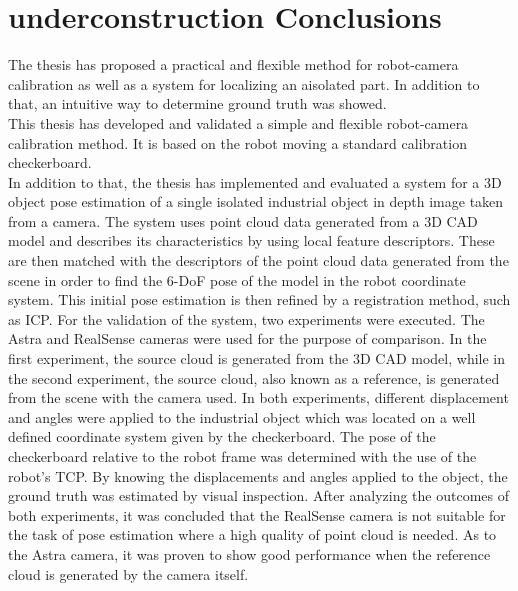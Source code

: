\chapter{underconstruction Conclusions}
\label{chap:con}


The thesis has proposed a practical and flexible method for robot-camera calibration as well as a system for localizing an aisolated part. In addition to that, an intuitive way to determine ground truth was showed.\\

This thesis has developed and validated a simple and flexible robot-camera calibration method. It is based on the robot moving a standard calibration checkerboard. \\



In addition to that, the thesis has implemented and evaluated a system for a 3D object pose estimation of a single isolated industrial object in depth image taken from a camera. The system uses point cloud data generated from a 3D CAD model and describes its characteristics by using local feature descriptors. These are then matched with the descriptors of the point cloud data generated from the scene in order to find the 6-DoF pose of the model in the robot coordinate system. This initial pose estimation is then refined by a registration method, such as ICP.  For the validation of the system, two experiments were executed. The Astra and RealSense cameras were used for the purpose of comparison. In the first experiment,  the source cloud is generated from the 3D CAD model, while in the second experiment, the source cloud, also known as a reference, is generated from the scene with the camera used. In both experiments, different displacement and angles were applied to the industrial object which was located on a well defined coordinate system given by the checkerboard. The pose of the checkerboard relative to the robot frame was determined with the use of the robot's TCP. By knowing the displacements and angles applied to the object, the ground truth was estimated by visual inspection.  After analyzing the outcomes of both experiments, it was concluded that the RealSense camera is not suitable for the task of pose estimation where a high quality of point cloud is needed. As to the Astra camera, it was proven to show good performance when the reference cloud is generated by the camera itself. \\





\iffalse
A robot-camera calibration is performed also.
The contributions of this thesis are as follows: The system uses FPFH (Fast Point Feature Histogram) for describing the local region and a hypothesize-and-test paradigm, e.g. RANSAC in the matching process. In contrast to several approaches those whose rely on Point Pair Features as feature descriptors and a geometry hashing, e.g. voting-scheme as the matching process.
\fi